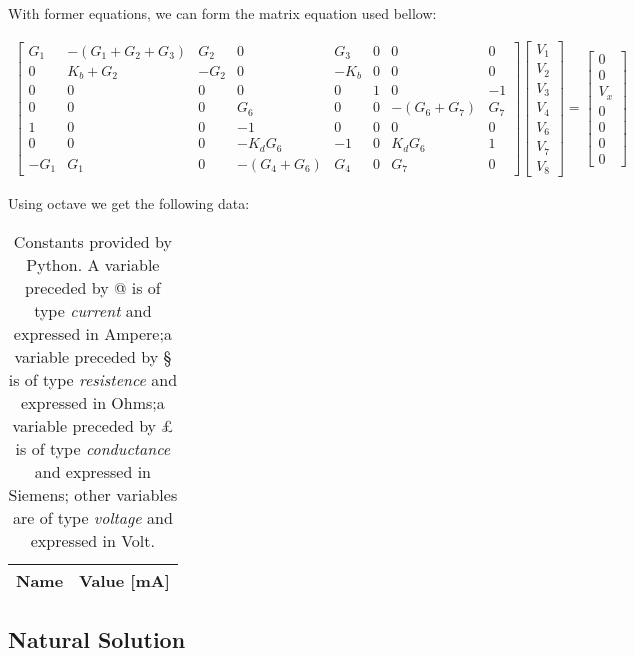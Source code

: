 With former equations, we can form the matrix equation used bellow:
\usepackage{amsmath}
\begin{gather}
	\begin{bmatrix}
		G_1 & -(G_1 + G_2 + G_3) & G_2 & 0 & G_3 & 0 & 0 & 0 \\ 
		0 & K_b + G_2 & -G_2 & 0 & -K_b & 0 & 0 & 0 \\
		0 & 0 & 0 & 0 & 0 & 1 & 0 & -1 \\ 
		0 & 0 & 0 & G_6 & 0 & 0 & -(G_6 + G_7) & G_7 \\
		1 & 0 & 0 & -1 & 0 & 0 & 0 & 0 \\
		0 & 0 & 0 & -K_dG_6 & -1 & 0 & K_dG_6 & 1 \\
		-G_1 & G_1 & 0 & -(G_4 + G_6) & G_4 & 0 & G_7 & 0
	\end{bmatrix}
	\begin{bmatrix} V_1 \\ V_2 \\ V_3 \\ V_4 \\ V_6 \\ V_7 \\ V_8 \end{bmatrix}
	=
	\begin{bmatrix} 0 \\ 0 \\ V_x \\ 0 \\ 0 \\ 0 \\ 0 \end{bmatrix}
	
\end{gather}

Using octave we get the following data:
\begin{table}[!h]
	\centering
	\begin{tabular}{|l|r|}
		\hline    
		{\bf Name} & {\bf Value [mA]} \\ \hline
		
	\end{tabular}
	\caption{Constants provided by Python. A variable preceded by @ is of type {\em current}
		and expressed in Ampere;a variable preceded by § is of type {\it resistence} and expressed in
		Ohms;a variable preceded by £ is of type {\it conductance} and expressed in
		Siemens; other variables are of type {\it voltage} and expressed in
		Volt.}
	\label{tab:op}
\end{table}


\subsection{Natural Solution}

